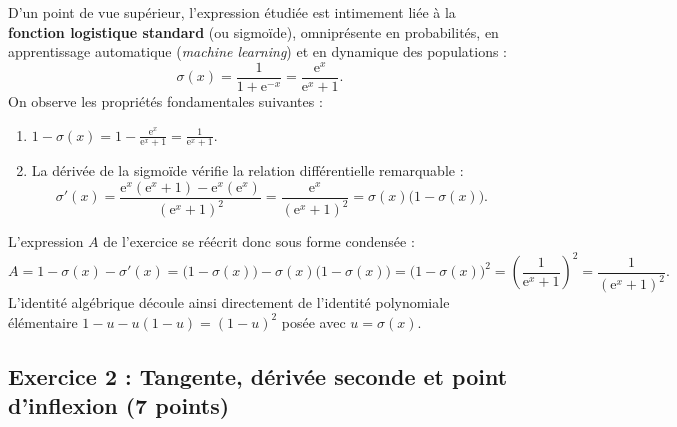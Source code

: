 \documentclass[11pt,a4paper]{article}
\newcommand{\e}{\mathrm{e}}
\begin{document}
\begin{remarquebox}
D'un point de vue supérieur, l'expression étudiée est intimement liée à la \textbf{fonction logistique standard} (ou sigmoïde), omniprésente en probabilités, en apprentissage automatique (\textit{machine learning}) et en dynamique des populations :
\[
\sigma(x) = \frac{1}{1 + \e^{-x}} = \frac{\e^x}{\e^x + 1}.
\]
On observe les propriétés fondamentales suivantes :
\begin{enumerate}
    \item $1 - \sigma(x) = 1 - \frac{\e^x}{\e^x + 1} = \frac{1}{\e^x + 1}$.
    \item La dérivée de la sigmoïde vérifie la relation différentielle remarquable :
    \[
    \sigma'(x) = \frac{\e^x(\e^x + 1) - \e^x(\e^x)}{(\e^x + 1)^2} = \frac{\e^x}{(\e^x + 1)^2} = \sigma(x)\bigl(1 - \sigma(x)\bigr).
    \]
\end{enumerate}
L'expression $A$ de l'exercice se réécrit donc sous forme condensée :
\[
A = 1 - \sigma(x) - \sigma'(x) = \bigl(1 - \sigma(x)\bigr) - \sigma(x)\bigl(1 - \sigma(x)\bigr) = \bigl(1 - \sigma(x)\bigr)^2 = \left(\frac{1}{\e^x + 1}\right)^2 = \frac{1}{(\e^x + 1)^2}.
\]
L'identité algébrique découle ainsi directement de l'identité polynomiale élémentaire $1 - u - u(1 - u) = (1 - u)^2$ posée avec $u = \sigma(x)$.
\end{remarquebox}

\vspace{0.4cm}

\subsection*{Exercice 2 : Tangente, dérivée seconde et point d'inflexion \hfill \normalfont\normalsize (7 points)}
\end{document}

